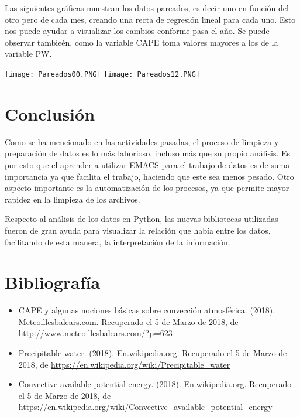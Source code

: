 \documentclass{article}
\begin{document}
Las siguientes gráficas muestran los datos pareados, es decir uno en función del otro pero de cada mes, creando una recta de regresión lineal para cada uno. Esto nos puede ayudar a visualizar los cambios conforme pasa el año. Se puede observar tambieén, como la variable CAPE toma valores mayores a los de la variable PW.
\begin{center}
    \texttt{[image: Pareados00.PNG]}
    \texttt{[image: Pareados12.PNG]}
\end{center}

\section{Conclusión}
Como se ha mencionado en las actividades pasadas, el proceso de limpieza y preparación de datos es lo más laborioso, incluso más que su propio análisis. Es por esto que el aprender a utilizar EMACS para el trabajo de datos es de suma importancia ya que facilita el trabajo, haciendo que este sea menos pesado. Otro aspecto importante es la automatización de los procesos, ya que permite mayor rapidez en la limpieza de los archivos.

Respecto al análisis de los datos en Python, las nuevas bibliotecas utilizadas fueron de gran ayuda para visualizar la relación que había entre los datos, facilitando de esta manera, la interpretación de la información.

\section{Bibliografía}
\begin{itemize}
\item CAPE y algunas nociones básicas sobre convección atmosférica. (2018). Meteoillesbalears.com. Recuperado el 5 de Marzo de 2018, de \url{http://www.meteoillesbalears.com/?p=623}
\item Precipitable water. (2018). En.wikipedia.org. Recuperado el 5 de Marzo de 2018, de \url{https://en.wikipedia.org/wiki/Precipitable_water}
\item Convective available potential energy. (2018). En.wikipedia.org. Recuperado el 5 de Marzo de 2018, de \url{https://en.wikipedia.org/wiki/Convective_available_potential_energy}
\end{itemize}
\end{document}

